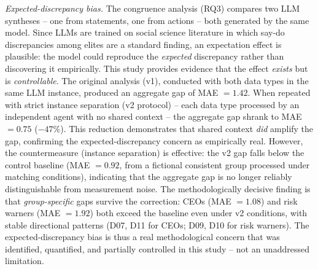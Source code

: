 \documentclass[12pt,a4paper]{article}
\begin{document}
\emph{Expected-discrepancy bias.} The congruence analysis (RQ3) compares two LLM syntheses -- one from statements, one from actions -- both generated by the same model. Since LLMs are trained on social science literature in which say-do discrepancies among elites are a standard finding, an expectation effect is plausible: the model could reproduce the \emph{expected} discrepancy rather than discovering it empirically. This study provides evidence that the effect \emph{exists} but is \emph{controllable}. The original analysis (v1), conducted with both data types in the same LLM instance, produced an aggregate gap of MAE $= 1.42$. When repeated with strict instance separation (v2 protocol) -- each data type processed by an independent agent with no shared context -- the aggregate gap shrank to MAE $= 0.75$ ($-47\%$). This reduction demonstrates that shared context \emph{did} amplify the gap, confirming the expected-discrepancy concern as empirically real. However, the countermeasure (instance separation) is effective: the v2 gap falls below the control baseline (MAE $= 0.92$, from a fictional consistent group processed under matching conditions), indicating that the aggregate gap is no longer reliably distinguishable from measurement noise. The methodologically decisive finding is that \emph{group-specific} gaps survive the correction: CEOs (MAE $= 1.08$) and risk warners (MAE $= 1.92$) both exceed the baseline even under v2 conditions, with stable directional patterns (D07, D11 for CEOs; D09, D10 for risk warners). The expected-discrepancy bias is thus a real methodological concern that was identified, quantified, and partially controlled in this study -- not an unaddressed limitation.
\end{document}
